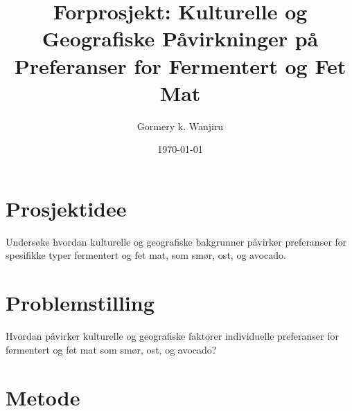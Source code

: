 \documentclass{article}
\begin{document}
\title{Forprosjekt: Kulturelle og Geografiske Påvirkninger på Preferanser for Fermentert og Fet Mat}
\author{Gormery k. Wanjiru}
\date{\today}

\maketitle

\section*{Prosjektidee}

Undersøke hvordan kulturelle og geografiske bakgrunner påvirker preferanser for spesifikke typer fermentert og fet mat, som smør, ost, og avocado.

\section*{Problemstilling}

Hvordan påvirker kulturelle og geografiske faktorer individuelle preferanser for fermentert og fet mat som smør, ost, og avocado?

\section*{Metode}
\end{document}
